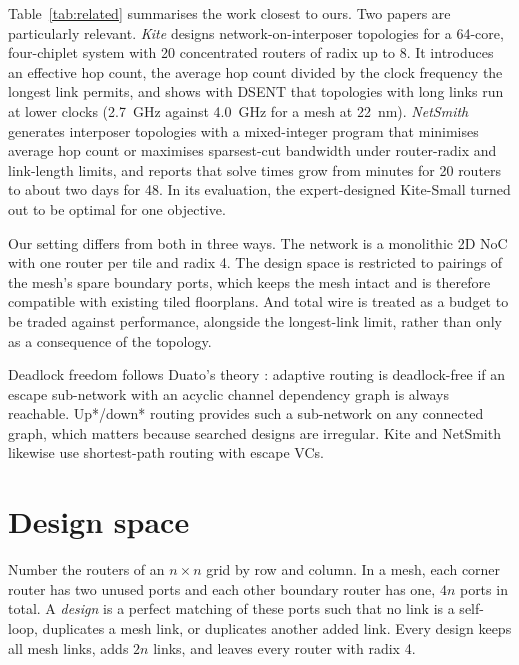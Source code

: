 \documentclass[preprint,12pt,a4paper]{elsarticle}
\begin{document}
Table~\ref{tab:related} summarises the work closest to ours. Two papers are
particularly relevant. \emph{Kite} \cite{kite} designs network-on-interposer
topologies for a 64-core, four-chiplet system with 20 concentrated routers
of radix up to 8. It introduces an effective hop count, the average hop
count divided by the clock frequency the longest link permits, and shows
with DSENT that topologies with long links run at lower clocks (2.7~GHz
against 4.0~GHz for a mesh at 22~nm). \emph{NetSmith} \cite{netsmith}
generates interposer topologies with a mixed-integer program that minimises
average hop count or maximises sparsest-cut bandwidth under router-radix
and link-length limits, and reports that solve times grow from minutes for
20 routers to about two days for 48. In its evaluation, the expert-designed
Kite-Small turned out to be optimal for one objective.

Our setting differs from both in three ways. The network is a monolithic
2D NoC with one router per tile and radix 4. The design space is restricted
to pairings of the mesh's spare boundary ports, which keeps the mesh intact
and is therefore compatible with existing tiled floorplans. And total wire
is treated as a budget to be traded against performance, alongside the
longest-link limit, rather than only as a consequence of the topology.

Deadlock freedom follows Duato's theory \cite{duato1993theory}: adaptive
routing is deadlock-free if an escape sub-network with an acyclic channel
dependency graph \cite{dally1987deadlock} is always reachable. Up*/down*
routing \cite{schroeder1991autonet} provides such a sub-network on any
connected graph, which matters because searched designs are irregular. Kite
and NetSmith likewise use shortest-path routing with escape VCs.

\section{Design space}
\label{sec:space}

Number the routers of an $n\times n$ grid by row and column. In a mesh,
each corner router has two unused ports and each other boundary router has
one, $4n$ ports in total. A \emph{design} is a perfect matching of these
ports such that no link is a self-loop, duplicates a mesh link, or
duplicates another added link. Every design keeps all mesh links, adds $2n$
links, and leaves every router with radix 4.
\end{document}
